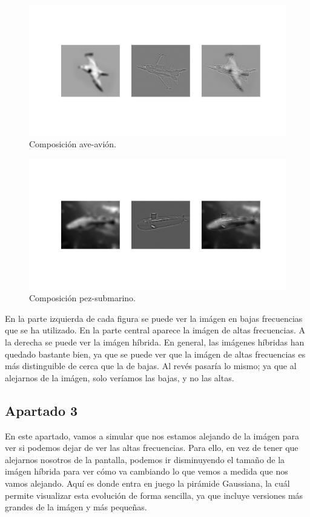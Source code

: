 \documentclass[11pt,a4paper]{article}
\begin{document}
\begin{figure}[H]
\centering
\includegraphics[scale=0.3]{img/hyb4.png}
\caption{Composición ave-avión.}
\label{fig:hyb4}
\end{figure}

\begin{figure}[H]
\centering
\includegraphics[scale=0.3]{img/hyb5.png}
\caption{Composición pez-submarino.}
\label{fig:hyb5}
\end{figure}

En la parte izquierda de cada figura se puede ver la imágen en bajas frecuencias que se ha utilizado. En la parte central
aparece la imágen de altas frecuencias. A la derecha se puede ver la imágen híbrida. En general, las imágenes híbridas
han quedado bastante bien, ya que se puede ver que la imágen de altas frecuencias es más distinguible de cerca
que la de bajas. Al revés pasaría lo mismo; ya que al alejarnos de la imágen, solo veríamos las bajas, y no las altas.

\subsection{Apartado 3}

En este apartado, vamos a simular que nos estamos alejando de la imágen para ver si podemos dejar de ver las altas
frecuencias. Para ello, en vez de tener que alejarnos nosotros de la pantalla, podemos ir disminuyendo el tamaño de la
imágen híbrida para ver cómo va cambiando lo que vemos a medida que nos vamos alejando. Aquí es donde entra en juego la pirámide
Gaussiana, la cuál permite visualizar esta evolución de forma sencilla, ya que incluye versiones más grandes de la
imágen y más pequeñas.
\end{document}
